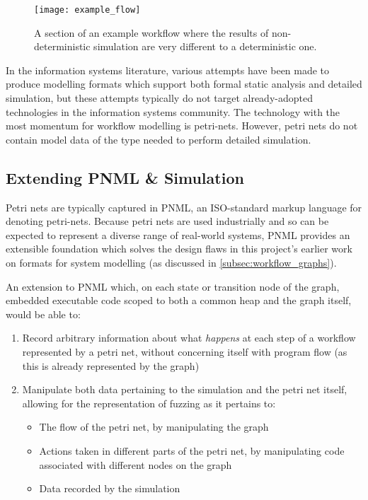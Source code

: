 \documentclass[11pt]{article}
\newcommand{\ampersand}{\&}
\begin{document}
\begin{figure}[h]
\centering
\texttt{[image: example\_flow]}
\caption{A section of an example workflow where the results of non-deterministic simulation are very different to a deterministic one.}
\label{fig:workflow_state}
\end{figure}

In the information systems literature, various attempts have been made to
produce modelling formats which support both formal static analysis and detailed
simulation\cite{bazoun2014business,dori1995object}, but these attempts typically
do not target already-adopted technologies in the information systems community.
The technology with the most momentum for workflow modelling is
petri-nets\cite{threegoodreasons}. However, petri nets do not contain model data
of the type needed to perform detailed simulation. 

\subsection{Extending PNML \ampersand{} Simulation}
\label{sec:org5baa71b}
\label{sec:future_notation} Petri nets are typically captured in
PNML\cite{iso_pnml}, an ISO-standard markup language for denoting petri-nets.
Because petri nets are used industrially and so can be expected to represent
a diverse range of real-world systems, PNML provides an extensible foundation
which solves the design flaws in this project's earlier work on formats for
system modelling (as discussed in \cref{subsec:workflow_graphs}).

An extension to PNML which, on each state or transition node of the graph,
embedded executable code scoped to both a common heap and the graph itself,
would be able to:

\begin{enumerate}
\item Record arbitrary information about what \emph{happens} at each step of a workflow
represented by a petri net, without concerning itself with program flow (as
this is already represented by the graph)
\item Manipulate both data pertaining to the simulation and the petri net itself,
allowing for the representation of fuzzing as it pertains to:
\begin{itemize}
\item The flow of the petri net, by manipulating the graph
\item Actions taken in different parts of the petri net, by manipulating code
associated with different nodes on the graph
\item Data recorded by the simulation
\end{itemize}
\end{enumerate}
\end{document}
